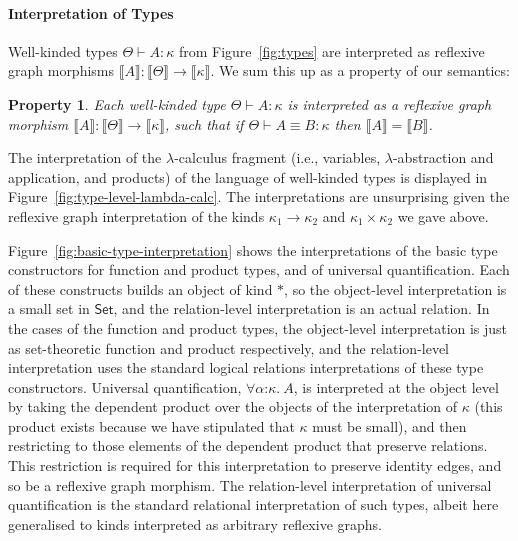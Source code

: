 \documentclass{sigplanconf}
\newtheorem{property}{Property}
\theoremstyle{examplestyle}
\newcommand{\sem}[1]{\llbracket #1 \rrbracket}
\newcommand{\Set}{\mathsf{Set}}
\begin{document}
\paragraph{Interpretation of Types} Well-kinded types $\Theta \vdash A
: \kappa$ from Figure~\ref{fig:types} are interpreted as reflexive
graph morphisms $\sem{A} : \sem{\Theta} \to \sem{\kappa}$. We sum this
up as a property of our semantics:
\begin{property}\label{property:semantic-types}
  Each well-kinded type $\Theta \vdash A : \kappa$ is interpreted as a
  reflexive graph morphism $\sem{A} : \sem{\Theta} \to \sem{\kappa}$,
  such that if $\Theta \vdash A \equiv B : \kappa$ then $\sem{A} =
  \sem{B}$.
\end{property}
%
%
The interpretation of the $\lambda$-calculus fragment (i.e.,
variables, $\lambda$-abstraction and application, and products) of the
language of well-kinded types is displayed in
Figure~\ref{fig:type-level-lambda-calc}. The interpretations are
unsurprising given the reflexive graph interpretation of the kinds
$\kappa_1 \to \kappa_2$ and $\kappa_1 \times \kappa_2$ we gave above.

Figure~\ref{fig:basic-type-interpretation} shows the interpretations
of the basic type constructors for function and product types, and
of universal quantification. Each of these constructs builds an object of
kind $*$, so the object-level interpretation is a small set in $\Set$,
and the relation-level interpretation is an actual relation. In the
cases of the function and product types, the object-level
interpretation is just as set-theoretic function and product
respectively, and the relation-level interpretation uses the standard
logical relations interpretations of these type
constructors. Universal quantification, $\forall
\alpha\mathord:\kappa.~A$, is interpreted at the object level by
taking the dependent product over the objects of the interpretation of
$\kappa$ (this product exists because we have stipulated that $\kappa$
must be small), and then restricting to those elements of the
dependent product that preserve relations. This restriction is
required for this interpretation to preserve identity edges, and so be
a reflexive graph morphism. The relation-level interpretation of
universal quantification is the standard relational interpretation of
such types, albeit here generalised to kinds interpreted as arbitrary
reflexive graphs.
\end{document}
